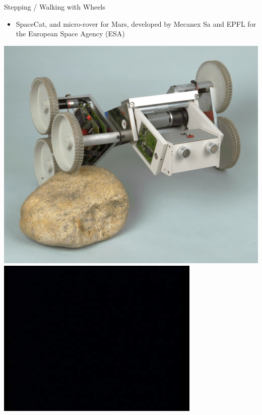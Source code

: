 \documentclass[compress]{beamer}
\begin{document}
\begin{frame}{Stepping / Walking with Wheels}

\begin{itemize}
    \item SpaceCat, and micro-rover for Mars, developed by Mecanex Sa and EPFL
  for the European Space Agency (ESA)
\end{itemize}

    \begin{center}
        \includegraphics[width=0.4\linewidth]{walkingwheels_ex1}
        \includegraphics[width=0.4\linewidth]{walkingwheels_ex2}
    \end{center}
\end{frame}

\end{document}
